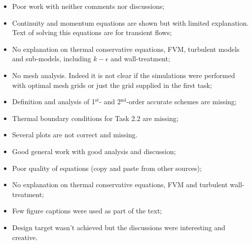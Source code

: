 \documentclass[14pt,twoside]{report}
\newcommand\blankpage{%
    \null
    \thispagestyle{empty}%
    \addtocounter{page}{-1}%
    \newpage}
\begin{document}
\clearpage 





\bigskip


\medskip

  \begin{itemize}
%
     \item Poor work with neither comments nor discussions;
     \item Continuity and momentum equations are shown but with limited explanation. Text of solving this equations are for transient flows;
     \item No explanation on thermal conservative equations, FVM, turbulent models and sub-models, including $k-\epsilon$ and wall-treatment;%
     \item No mesh analysis. Indeed it is not clear if the simulations were performed with optimal mesh grids or just the grid supplied in the first task;
     \item Definition and analysis of 1$^{\text{st}}$- and 2$^{\text{nd}}$-order accurate schemes are missing;
     \item Thermal boundary conditions for Task 2.2 are missing;
     \item Several plots are not correct and missing.
%
  \end{itemize}%

\clearpage 




\bigskip


\medskip

  \begin{itemize}
%
     \item Good general work with good analysis and discussion;
     \item Poor quality of equations (copy and paste from other sources);
     \item No explanation on thermal conservative equations, FVM and turbulent wall-treatment;
     \item Few figure captions were used as part of the text;
     \item Design target wasn't achieved but the discussions were interesting and creative. 
%
  \end{itemize}%
\end{document}
